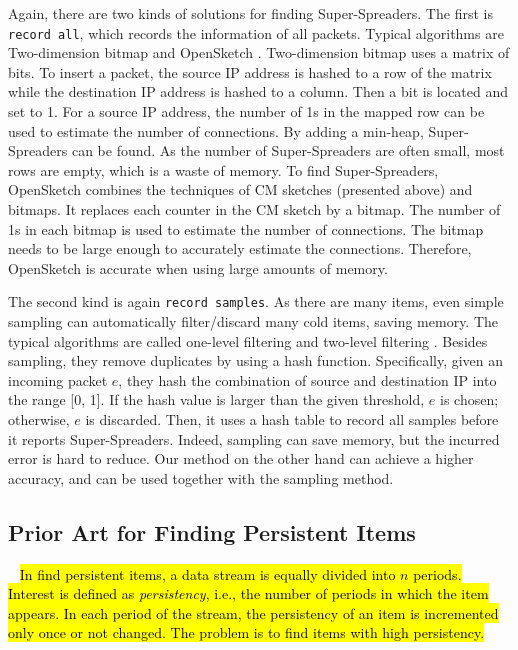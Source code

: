 Again, there are two kinds of solutions for finding Super-Spreaders. 
The first is \texttt{record all}, which records the information of all packets. Typical algorithms are Two-dimension bitmap \cite{twodimensional} and OpenSketch \cite{opensketch}. 
%
Two-dimension bitmap \cite{twodimensional} uses a matrix of bits. To insert a packet, the source IP address is hashed to a row of the matrix while the destination IP address is hashed to a column. Then a bit is located and set to 1.
%
For a source IP address, the number of 1s in the mapped row can be used to estimate the number of connections. By adding a min-heap, Super-Spreaders can be found.
%
As the number of Super-Spreaders are often small, most rows are empty, which is a waste of memory.
%
To find Super-Spreaders, OpenSketch \cite{opensketch} combines the techniques of CM sketches (presented above) and bitmaps. It replaces each counter in the CM sketch by a bitmap. The number of 1s in each bitmap is used to estimate the number of connections. 
%
The bitmap needs to be large enough to accurately estimate the connections. Therefore, OpenSketch is accurate when using large amounts of memory.

The second kind is again \texttt{record samples}.
As there are many items, even simple sampling can automatically filter/discard many cold items, saving memory.
The typical algorithms are called one-level filtering \cite{superspreader} and two-level filtering \cite{superspreader}. Besides sampling, they remove duplicates by using a hash function.
%
Specifically, given an incoming packet $e$, they hash the combination of source and destination IP into the range [0, 1]. If the hash value is larger than the given threshold, $e$ is chosen; otherwise, $e$ is discarded.
Then, it uses a hash table to record all samples before it reports Super-Spreaders.
%
Indeed, sampling can save memory, but the incurred error is hard to reduce.
%
Our method on the other hand can achieve a higher accuracy, and can be used together with the sampling method.

\vvv
\presec
\subsection{Prior Art for Finding Persistent Items}\postsec~
\hl{In find persistent items, a data stream is equally divided into $n$ periods. Interest is defined as \textit{persistency}, i.e., the number of periods in which the item appears. In each period of the stream, the persistency of an item is incremented only once or not changed. The problem is to find items with high persistency.}

